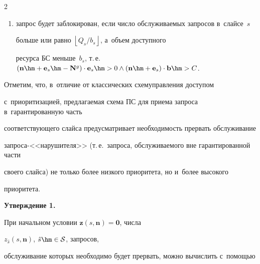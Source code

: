 \begin{multicols}{2}
\begin{enumerate}[(1)]
ресурсов БС меньше~$b_s$, т.\,е.\ $\left(\mathbf{n}\hm+\mathbf{e}_s \hm-


\mathbf{N}^{g}\right) \cdot \mathbf{e}_s\hm \leq 0 \hm\land \left(\mathbf{n} \hm+ 


\mathbf{e}_s \hm- \mathbf{z}\left(s,\mathbf{n}\right)\right) \cdot \mathbf{b} \hm\leq 


C$;


\item запрос будет заблокирован, если число об\-слу\-жи\-ва\-емых запросов в~слайсе~$s$ 


больше или рав\-но $\left\lfloor Q_s/b_s \right\rfloor$, а~объем доступного 


ресурса БС меньше~$b_s$, т.\,е.\ $\left( \mathbf{n}\hm + \mathbf{e}_s \hm-


\mathbf{N}^{g} \right) \cdot \mathbf{e}_s \hm> 0 \land \left( \mathbf{n} \hm+ 


\mathbf{e}_s \right) \cdot \mathbf{b} \hm> C$.


\end{enumerate}





Отметим, что, в~отличие от классических схем\linebreak управ\-ле\-ния доступом 


с~приоритизацией, предлагаемая схема ПС для приема запроса в~гарантированную часть 


соответствующего слайса \mbox{предусмат\-ри\-ва\-ет} необходимость прервать обслуживание 


за\-про\-са-<<на\-ру\-ши\-те\-ля>> (т.\,е.\ запроса, об\-слу\-жи\-ва\-емо\-го вне гарантированной час\-ти 


своего слайса) не только более низкого приоритета, но и~более высокого 


приоритета.













\noindent


\textbf{Утверждение 1.}


При начальном условии $\mathbf{z}\left(s,\mathbf{n}\right)=\mathbf{0}$, числа 


$z_{\hat{s}}\left(s,\mathbf{n}\right)$, $\hat{s}\hm\in\mathcal{S}$, запросов, 


обслуживание которых необходимо будет прервать, можно вычислить с~по\-мощью 



\end{multicols}
